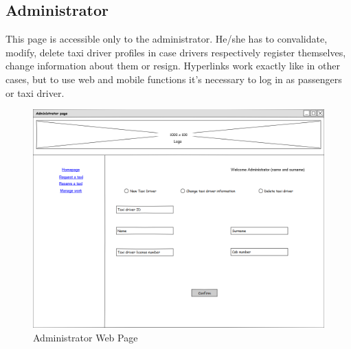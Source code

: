 \subsection{Administrator}
This page is accessible only to the administrator. He/she has to convalidate, modify, delete taxi driver profiles in case drivers respectively register themselves, change information about them or resign. \newline Hyperlinks work exactly like in other cases, but to use web and mobile functions it's necessary to log in as passengers or taxi driver.
\begin{figure}[H]
\centering
\includegraphics[scale=0.35]{mockups/administrator.png}
\caption{Administrator Web Page}
\end{figure}
